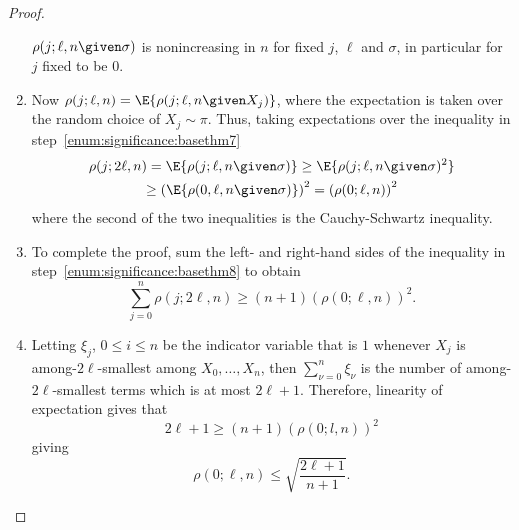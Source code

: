 \documentclass[12pt]{article}
\begin{document}
\begin{proof}
\begin{enumerate}
            \( \rho(j; \ell, n \given \sigma) \) is nonincreasing in
            \( n \) for fixed \( j \), \( \ell \) and \( \sigma \), in
            particular for \( j \) fixed to be \( 0 \).
        \item\label{enum:significance:basethm8}
            Now \( \rho(j;\ell,n) = \E{\rho(j; \ell, n \given X_j)} \),
            where the expectation is taken over the random choice of \(
            X_j \sim \pi \).  Thus, taking expectations over the
            inequality in step~\ref{enum:significance:basethm7}
            \begin{multline}
                \rho(j; 2\ell, n) = \E{\rho(j;
                \ell, n \given \sigma)} \ge \E{\rho(j; \ell, n \given
                \sigma)^2} \\
                \ge \left( \E{\rho(0, \ell, n \given \sigma)}\right)^2 =
                \left( \rho(0; \ell, n) \right)^2
            \end{multline}
            where the second of the two inequalities is the
            Cauchy-Schwartz inequality.
        \item
            To complete the proof, sum the left- and right-hand sides
            of the inequality in step~\ref{enum:significance:basethm8} to obtain
            \[
                \sum\limits_{j=0}^n \rho(j; 2\ell, n) \ge (n+1) (\rho(0;
                \ell, n))^2.
            \]
        \item
            Letting \( \xi_j \), \( 0 \le i \le n \) be the indicator
            variable that is \( 1 \) whenever \( X_j \) is among-\( 2\ell
            \)-smallest among \( X_0, \dots , X_n \), then \( \sum_{\nu=0}^n
            \xi_{\nu} \) is the number of among-\( 2\ell \)-smallest
            terms which is at most \( 2\ell + 1 \).  Therefore,
            linearity of expectation gives that
            \[
                2\ell + 1 \ge (n + 1)(\rho(0; l,n) )^2
            \] giving
            \[
                \rho(0; \ell, n) \le \sqrt{ \frac{2\ell + 1}{n+1}}.
            \]
    \end{enumerate}
\end{proof}
\end{document}
